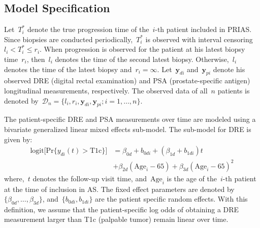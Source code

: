 \begin{subappendices}
\subsection{Model Specification}
\label{c4:appendix:prias_model}
Let~$T_i^*$ denote the true progression time of the~${i\mbox{-th}}$ patient included in PRIAS. Since biopsies are conducted periodically,~$T_i^*$ is observed with interval censoring~${l_i < T_i^* \leq r_i}$. When progression is observed for the patient at his latest biopsy time~$r_i$, then~$l_i$ denotes the time of the second latest biopsy. Otherwise,~$l_i$ denotes the time of the latest biopsy and~${r_i=\infty}$. Let~$\boldsymbol{y}_{di}$ and~$\boldsymbol{y}_{pi}$ denote his observed DRE (digital rectal examination) and PSA (prostate-specific antigen) longitudinal measurements, respectively. The observed data of all~$n$ patients is denoted by~${\mathcal{D}_n = \{l_i, r_i, \boldsymbol{y}_{di}, \boldsymbol{y}_{pi}; i = 1, \ldots, n\}}$.

The patient-specific DRE and PSA measurements over time are modeled using a bivariate generalized linear mixed effects sub-model. The sub-model for DRE is given by:
\begin{equation}
\label{c4:eq:long_model_dre}
\begin{split}
    \mbox{logit} \big[\mbox{Pr}\{y_{di}(t) > \mbox{T1c}\}\big] &= \beta_{0d} + b_{0di} + (\beta_{1d} + b_{1di}) t\\
    &+ \beta_{2d} (\mbox{Age}_i-65) + \beta_{3d} (\mbox{Age}_i-65)^2
    \end{split}
\end{equation}
where,~$t$ denotes the follow-up visit time, and~$\mbox{Age}_i$ is the age of the~${i\mbox{-th}}$ patient at the time of inclusion in AS. The fixed effect parameters are denoted by~${\{\beta_{0d}, \ldots, \beta_{3d}\}}$, and~${\{b_{0di}, b_{1di}\}}$ are the patient specific random effects. With this definition, we assume that the patient-specific log odds of obtaining a DRE measurement larger than T1c (palpable tumor) remain linear over time. 


\end{subappendices}
